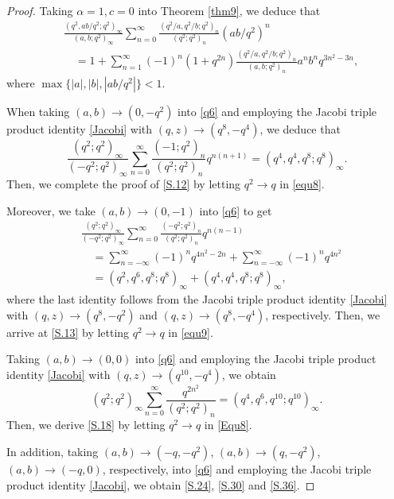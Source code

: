 \documentclass[reqno,12pt]{amsart}
\theoremstyle{remark}
\numberwithin{equation}{section}
\begin{document}
\begin{proof}
Taking $\alpha=1,c=0$ into Theorem \ref{thm9}, we deduce that
\begin{align}
&\frac{\left(q^2,ab/q^2;q^2\right)_{\infty}}
{\left(a,b;q^2\right)_{\infty}}\sum_{n=0}^{\infty}
\frac{\left(q^2/a,q^2/b;q^2\right)_{n}}
{\left(q^2;q^2\right)_n}\left(ab/q^2\right)^n\nonumber\\
&\quad=1+\sum_{n=1}^{\infty}\left(-1\right)^n\left(1+q^{2n}\right)
\frac{\left(q^2/a,q^2/b;q^2\right)_{n}}{\left(a,b;q^2\right)_n}
a^nb^nq^{3n^2-3n},\label{q6}
\end{align}
where $\max\{|a|,|b|,|ab/q^2|\}<1$.

When taking $\left(a,b\right)\to\left(0,-q^2\right)$ into \eqref{q6} and employing the Jacobi triple product identity \eqref{Jacobi}
with $\left(q,z\right)\to\left(q^8,-q^4\right)$, we deduce that
\begin{equation}\label{equ8}
\frac{\left(q^2;q^2\right)_{\infty}}{\left(-q^2;q^2\right)_{\infty}}
\sum_{n=0}^{\infty}\frac{\left(-1;q^2\right)_{n}}{\left(q^2;q^2\right)_{n}}
q^{n\left(n+1\right)}
=\left(q^4,q^4,q^8;q^8\right)_{\infty}.
\end{equation}
Then, we complete the proof of \eqref{S.12} by letting $q^2\to q$ in \eqref{equ8}.

Moreover, we take $\left(a,b\right)\to\left(0,-1\right)$ into  \eqref{q6} to get
\begin{align}
&\frac{\left(q^2;q^2\right)_{\infty}}{\left(-q^2;q^2\right)_{\infty}}
\sum_{n=0}^{\infty}\frac{\left(-q^2;q^2\right)_{n}}{\left(q^2;q^2\right)_{n}}
q^{n\left(n-1\right)}\nonumber\\
&\quad=\sum_{n=-\infty}^{\infty}\left(-1\right)^nq^{4n^2-2n}
+\sum_{n=-\infty}^{\infty}\left(-1\right)^nq^{4n^2}\nonumber\\
&\quad=\left(q^2,q^6,q^8;q^8\right)_{\infty}
+\left(q^4,q^4,q^8;q^8\right)_{\infty},\label{equ9}
\end{align}
where the last identity follows from the Jacobi triple product identity \eqref{Jacobi} with $\left(q,z\right)\to\left(q^8,-q^2\right)$ and $\left(q,z\right)\to\left(q^8,-q^4\right)$, respectively.
Then, we arrive at \eqref{S.13} by letting $q^2\to q$ in \eqref{equ9}.

Taking $\left(a,b\right)\to\left(0,0\right)$ into \eqref{q6} and employing the Jacobi triple product identity \eqref{Jacobi} with $\left(q,z\right)\to\left(q^{10},-q^4\right)$, we obtain
\begin{equation}\label{Equ8}
\left(q^2;q^2\right)_{\infty}
\sum_{n=0}^{\infty}\frac{q^{2n^2}}{\left(q^2;q^2\right)_{n}}
=\left(q^4,q^6,q^{10};q^{10}\right)_{\infty}.
\end{equation}
Then, we derive \eqref{S.18} by letting $q^2\to q$ in \eqref{Equ8}.

In addition, taking $\left(a,b\right)\to\left(-q,-q^2\right)$, $\left(a,b\right)\to\left(q,-q^2\right)$, $\left(a,b\right)\to\left(-q,0\right)$, respectively, into  \eqref{q6} and employing the Jacobi triple product identity \eqref{Jacobi}, we obtain \eqref{S.24}, \eqref{S.30} and  \eqref{S.36}.
\end{proof}
\end{document}
